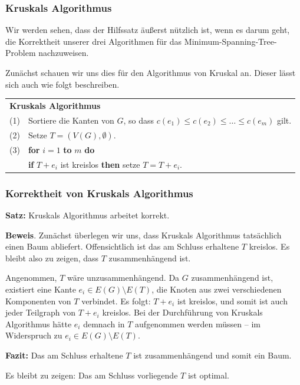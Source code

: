 \documentclass[smaller]{beamer}
\begin{document}
\begin{frame}
 \frametitle{Kruskals Algorithmus}
 Wir werden sehen, dass der Hilfssatz äußerst nützlich ist, wenn es darum geht, die Korrektheit unserer drei Algorithmen für das \alert{Minimum-Spanning-Tree-Problem} nachzuweisen. \\ \medskip

Zunächst schauen wir uns dies für den Algorithmus von Kruskal an. Dieser lässt sich auch wie folgt beschreiben.

\begin{center}
	\begin{tabular}{rl}
		\multicolumn{2}{l}{\textbf{Kruskals Algorithmus}} \\
		(1)& Sortiere die Kanten von $G$, so dass $c(e_1) \leq c(e_2) \leq \ldots \leq c(e_m)$ gilt. \\
		(2)& Setze $T = (V(G), \emptyset)$. \\
		(3)& \textbf{for} $i=1$ \textbf{to} $m$ \textbf{do} \\
		   & \qquad \textbf{if} $T+e_i$ ist kreislos \textbf{then} setze $T=T+e_i$.
	\end{tabular}
\end{center}
\end{frame}

\begin{frame}
\frametitle{Korrektheit von Kruskals Algorithmus}
 
\textbf{Satz:} Kruskals Algorithmus arbeitet korrekt. \\ \medskip

\textbf{Beweis}. Zunächst überlegen wir uns, dass Kruskals Algorithmus \alert{tatsächlich einen Baum abliefert.} Offensichtlich ist das am Schluss erhaltene $T$ kreislos. Es bleibt also zu zeigen, dass $T$ zusammenhängend ist. \\ \medskip

\alert{Angenommen, $T$ wäre unzusammenhängend.} Da $G$ zusammenhängend ist, existiert eine Kante $e_i \in E(G) \setminus E(T)$, die Knoten aus zwei verschiedenen Komponenten von $T$ verbindet. Es folgt: $T+e_i$ ist kreislos, und somit ist auch jeder Teilgraph von $T+e_i$ kreislos. Bei der Durchführung von Kruskals Algorithmus hätte $e_i$ demnach in $T$ aufgenommen werden müssen -- im Widerspruch zu $e_i \in E(G) \setminus E(T)$. \\ \medskip

\textbf{Fazit:} Das am Schluss erhaltene $T$ ist zusammenhängend und somit ein Baum. \\ \medskip

\alert{Es bleibt zu zeigen: Das am Schluss vorliegende $T$ ist optimal.}
\end{frame}
\end{document}
